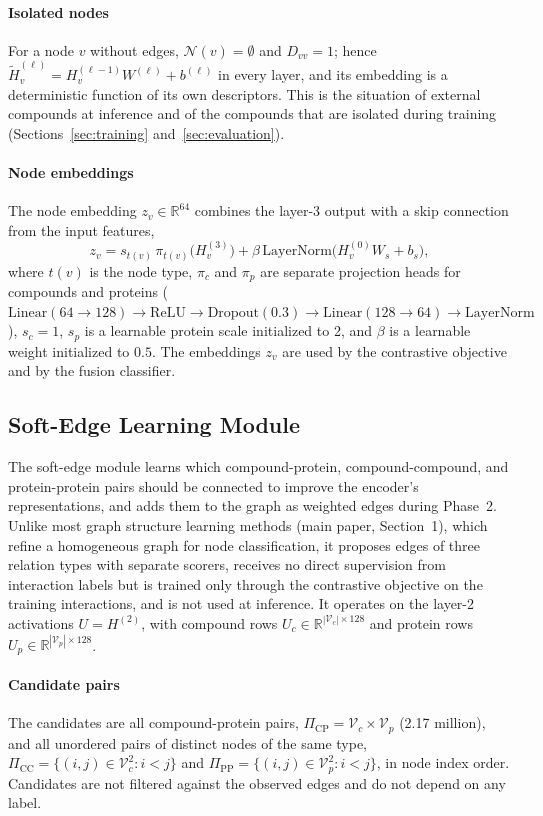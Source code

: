 \documentclass[11pt,letterpaper]{article}
\begin{document}
\paragraph{Isolated nodes}
For a node $v$ without edges, $\mathcal{N}(v)=\emptyset$ and $D_{vv}=1$; hence $\tilde{H}^{(\ell)}_v=H^{(\ell-1)}_v W^{(\ell)}+b^{(\ell)}$ in every layer, and its embedding is a deterministic function of its own descriptors. This is the situation of external compounds at inference and of the compounds that are isolated during training (Sections~\ref{sec:training} and~\ref{sec:evaluation}).

\paragraph{Node embeddings}
The node embedding $z_v\in\mathbb{R}^{64}$ combines the layer-3 output with a skip connection from the input features,
\[
z_v = s_{t(v)}\,\pi_{t(v)}\big(H^{(3)}_v\big) + \beta\,\mathrm{LayerNorm}\big(H^{(0)}_v W_s + b_s\big),
\]
where $t(v)$ is the node type, $\pi_c$ and $\pi_p$ are separate projection heads for compounds and proteins ($\mathrm{Linear}(64\to128)\to\mathrm{ReLU}\to\mathrm{Dropout}(0.3)\to\mathrm{Linear}(128\to64)\to\mathrm{LayerNorm}$), $s_c=1$, $s_p$ is a learnable protein scale initialized to 2, and $\beta$ is a learnable weight initialized to $0.5$. The embeddings $z_v$ are used by the contrastive objective and by the fusion classifier.

\subsection{Soft-Edge Learning Module}
\label{sec:softedge}
The soft-edge module learns which compound-protein, compound-compound, and protein-protein pairs should be connected to improve the encoder's representations, and adds them to the graph as weighted edges during Phase~2. Unlike most graph structure learning methods (main paper, Section~1), which refine a homogeneous graph for node classification, it proposes edges of three relation types with separate scorers, receives no direct supervision from interaction labels but is trained only through the contrastive objective on the training interactions, and is not used at inference. It operates on the layer-2 activations $U=H^{(2)}$, with compound rows $U_c\in\mathbb{R}^{|\mathcal{V}_c|\times 128}$ and protein rows $U_p\in\mathbb{R}^{|\mathcal{V}_p|\times 128}$.

\paragraph{Candidate pairs}
The candidates are all compound-protein pairs, $\Pi_{\text{CP}}=\mathcal{V}_c\times\mathcal{V}_p$ (2.17 million), and all unordered pairs of distinct nodes of the same type, $\Pi_{\text{CC}}=\{(i,j)\in\mathcal{V}_c^2: i<j\}$ and $\Pi_{\text{PP}}=\{(i,j)\in\mathcal{V}_p^2: i<j\}$, in node index order. Candidates are not filtered against the observed edges and do not depend on any label.
\end{document}
